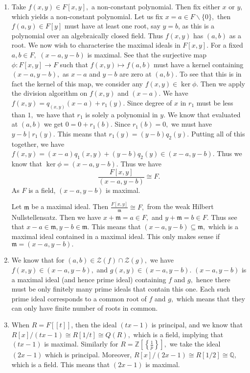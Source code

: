 \documentclass[]{article}
\begin{document}
\begin{enumerate}
	\item Take $f(x,y) \in F[x,y],$ a non-constant polynomial. Then fix either $x$ or $y,$ which yields a non-constant polynomial. Let us fix $x=a \in F\backslash \{0\},$ then $f(a,y) \in F[y]$ must have at least one root, say $y=b$, as this is a polynomial over an algebraically closed field. Thus $f(x,y)$ has $(a,b)$ as a root. We now wish to characterise the maximal ideals in $F[x,y].$ For a fixed $a,b \in F,$ $(x-a,y-b)$ is maximal. See that the surjective map $\phi: F[x,y] \rightarrow F$ such that $f(x,y) \mapsto f(a,b)$ must have a kernel containing $(x-a,y-b),$ as $x-a$ and $y-b$ are zero at $(a,b).$ To see that this is in fact the kernel of this map, we consider any $f(x,y) \in \ker \phi.$ Then we apply the division algorithm on $f(x,y)$ and $(x-a).$ We have $f(x,y)=q_(x,y)(x-a)+r_1(y).$ Since degree of $x$ in $r_1$ must be less than $1,$ we have that $r_1$ is solely a polynomial in $y.$ We know that evaluated at $(a,b)$ we get $0=0+r_1(b).$ Since $r_1(b)=0,$ we must have $y-b \mid r_1(y).$ This means that $r_1(y)=(y-b)q_2(y).$ Putting all of this together, we have $f(x,y)=(x-a)q_1(x,y)+(y-b)q_2(y) \in (x-a,y-b).$ Thus we know that $ \ker \phi=(x-a,y-b).$ Thus we have $$\frac{F[x,y]}{(x-a,y-b)} \cong F.$$ As $F$ is a field, $(x-a,y-b)$ is maximal. 
	
	Let $\mathfrak{m}$ be a maximal ideal. Then $\frac{F[x,y]}{\mathfrak{m}} \cong F,$ from the weak Hilbert Nullstellensatz. Then we have $x + \mathfrak{m}=a \in F,$ and $y + \mathfrak{m}= b \in F. $
	Thus see that $ x-a \in \mathfrak{m}, y-b \in \mathfrak{m}.$ This means that $(x-a,y-b) \subseteq \mathfrak{m},$ which is a maximal ideal contained in a maximal ideal. This only makes sense if $\mathfrak{m}=(x-a,y-b).$
	
	\item We know that for $(a,b) \in \mathcal{Z}(f) \cap \mathcal{Z}(g),$ we have $ f(x,y) \in (x-a,y-b),$ and $g(x,y) \in (x-a,y-b).$ $(x-a,y-b)$ is a maximal ideal (and hence prime ideal) containing $f$ and $g,$ hence there must be only finitely many prime ideals that contain this one. Each such prime ideal corresponds to a common root of $f$ and $g,$ which means that they can only have finite number of roots in common.
	
	\item When $R=F[[t]]$, then the ideal $(tx-1)$ is principal, and we know that $ R[x]/(tx-1)\cong R[1/t] \cong Q(R),$ which is a field, implying that $(tx-1)$ is maximal. Similarly for $R=\mathbb{Z}{ \left[ \left\{ \frac{1}{p} \right\} \right]},$ we take the ideal $(2x-1)$ which is principal. Moreover, $ R[x]/(2x-1)\cong R[1/2] \cong \mathbb{Q},$ which is a field. This means that $(2x-1)$ is maximal.
\end{enumerate} 
\end{document}
